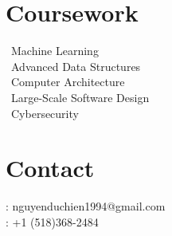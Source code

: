 \documentclass[]{deedy_format_Hien}
\begin{document}
\begin{minipage}[t]{0.325\textwidth}
\section{Coursework}
\vspace{1mm}
\flushleft
\textbullet \, Machine Learning \\
\textbullet \, Advanced Data Structures \\
\textbullet \, Computer Architecture \\
\textbullet \, Large-Scale Software Design \\
\textbullet \, Cybersecurity \\

\vspace{2mm}
\section{Contact}
\vspace{2mm}
{: nguyenduchien1994@gmail.com} \\
{: +1 (518)368-2484} \\






\end{minipage}
\end{document}
